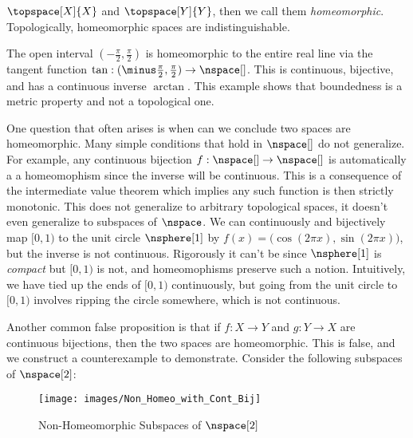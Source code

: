 \documentclass[oneside]{book}                                                  %
\begin{document}
                $\topspace[X]{X}$ and $\topspace[Y]{Y}$, then we call them
                \textit{homeomorphic}. Topologically, homeomorphic spaces are
                indistinguishable.
                \begin{example}
                    The open interval $(\minus\frac{\pi}{2},\frac{\pi}{2})$ is
                    homeomorphic to the entire real line via the tangent
                    function $\tan:(\minus\frac{\pi}{2},\frac{\pi}{2})%
                    \rightarrow\nspace[]$. This is continuous, bijective, and
                    has a continuous inverse $\arctan$. This example shows that
                    boundedness is a metric property and not a topological one.
                \end{example}
                One question that often arises is when can we conclude two
                spaces are homeomorphic. Many simple conditions that hold in
                $\nspace[]$ do not generalize. For example, any continuous
                bijection $f:\nspace[]\rightarrow\nspace[]$ is automatically a
                a homeomophism since the inverse will be continuous. This is a
                consequence of the intermediate value theorem which implies any
                such function is then strictly monotonic. This does not
                generalize to arbitrary topological spaces, it doesn't even
                generalize to subspaces of $\nspace$. We can continuously and
                bijectively map $[0,1)$ to the unit circle $\nsphere[1]$ by
                $f(x)=\big(\cos(2\pi{x}),\sin(2\pi{x})\big)$, but the inverse is
                not continuous. Rigorously it can't be since $\nsphere[1]$ is
                \textit{compact} but $[0,1)$ is not, and homeomophisms preserve
                such a notion. Intuitively, we have tied up the ends of $[0,1)$
                continuously, but going from the unit circle to $[0,1)$ involves
                ripping the circle somewhere, which is not continuous.
                \par\hfill\par
                Another common false proposition is that if $f:X\rightarrow{Y}$
                and $g:Y\rightarrow{X}$ are continuous bijections, then the two
                spaces are homeomorphic. This is false, and we construct a
                counterexample to demonstrate. Consider the following subspaces
                of $\nspace[2]$:
                \begin{figure}[H]
                    \centering
                    \captionsetup{type=figure}
                    \texttt{[image: images/Non\_Homeo\_with\_Cont\_Bij]}
                    \caption{Non-Homeomorphic Subspaces of $\nspace[2]$}
                    \label{fig:Non_Homeomorphic_Subspace}
                \end{figure}
\end{document}
